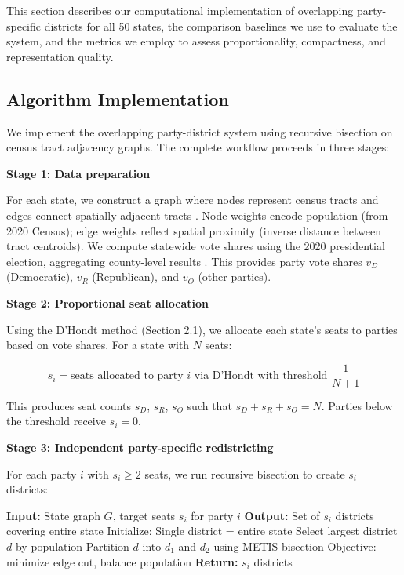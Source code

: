 
This section describes our computational implementation of overlapping party-specific districts for all 50 states, the comparison baselines we use to evaluate the system, and the metrics we employ to assess proportionality, compactness, and representation quality.

\subsection{Algorithm Implementation}

We implement the overlapping party-district system using recursive bisection on census tract adjacency graphs. The complete workflow proceeds in three stages:

\textbf{Stage 1: Data preparation}

For each state, we construct a graph where nodes represent census tracts and edges connect spatially adjacent tracts \citep{author2024recursive}. Node weights encode population (from 2020 Census); edge weights reflect spatial proximity (inverse distance between tract centroids). We compute statewide vote shares using the 2020 presidential election, aggregating county-level results \citep{leip2020}. This provides party vote shares $v_D$ (Democratic), $v_R$ (Republican), and $v_O$ (other parties).

\textbf{Stage 2: Proportional seat allocation}

Using the D'Hondt method (Section 2.1), we allocate each state's seats to parties based on vote shares. For a state with $N$ seats:

\begin{equation}
s_i = \text{seats allocated to party } i \text{ via D'Hondt with threshold } \frac{1}{N+1}
\end{equation}

This produces seat counts $s_D$, $s_R$, $s_O$ such that $s_D + s_R + s_O = N$. Parties below the threshold receive $s_i = 0$.

\textbf{Stage 3: Independent party-specific redistricting}

For each party $i$ with $s_i \geq 2$ seats, we run recursive bisection to create $s_i$ districts:

\begin{algorithm}[H]
\caption{Party-Specific Recursive Bisection}
\begin{algorithmic}[1]
\State \textbf{Input:} State graph $G$, target seats $s_i$ for party $i$
\State \textbf{Output:} Set of $s_i$ districts covering entire state
\State Initialize: Single district = entire state
    \State Select largest district $d$ by population
    \State Partition $d$ into $d_1$ and $d_2$ using METIS bisection \citep{karypis1998metis}
    \State Objective: minimize edge cut, balance population
\EndWhile
\State \textbf{Return:} $s_i$ districts
\end{algorithmic}
\end{algorithm}

